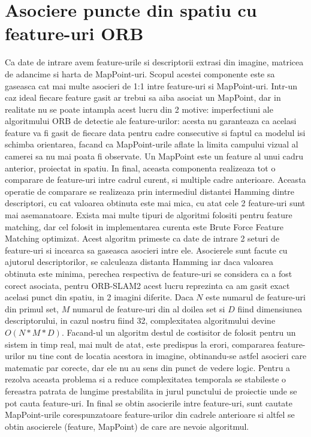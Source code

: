 \documentclass[12pt,a4paper]{report}
\begin{document}
\section{Asociere puncte din spatiu cu feature-uri ORB}
Ca date de intrare avem feature-urile si descriptorii extrasi din imagine, matricea
de adancime si harta de MapPoint-uri. Scopul acestei componente este sa gaseasca 
cat mai multe asocieri de 1:1 intre feature-uri si MapPoint-uri. Intr-un caz ideal
fiecare feature gasit ar trebui sa aiba asociat un MapPoint, dar in realitate nu se 
poate intampla acest lucru din 2 motive: 
imperfectiuni ale algoritmului ORB de detectie ale feature-urilor: acesta nu garanteaza 
ca acelasi feature va fi gasit de fiecare data pentru cadre consecutive si faptul ca 
modelul isi schimba orientarea, facand ca MapPoint-urile aflate la limita campului 
vizual al camerei sa nu mai poata fi observate. Un MapPoint este un feature 
al unui cadru anterior, proiectat in spatiu. In final, aceasta componenta realizeaza 
tot o comparare de feature-uri intre cadrul curent, si multiple cadre anterioare.
Aceasta operatie de comparare se realizeaza prin intermediul distantei Hamming dintre
descriptori, cu cat valoarea obtinuta este mai mica, cu atat cele 2 feature-uri sunt 
mai asemanatoare. Exista mai multe tipuri de algoritmi folositi pentru feature 
matching, dar cel folosit in implementarea curenta este Brute Force Feature Matching
optimizat. Acest algoritm primeste ca date de intrare 2 seturi de feature-uri si 
incearca sa gaseasca asocieri intre ele. Asocierele sunt facute cu ajutorul descriptorilor,
se calculeaza distanta Hamming iar daca valoarea obtinuta este minima, perechea 
respectiva de feature-uri se considera ca a fost corect asociata, pentru ORB-SLAM2 
acest lucru reprezinta ca am gasit exact acelasi punct din spatiu, in 2 imagini diferite.
Daca \(N\) este numarul de feature-uri din primul set, \(M\) numarul de feature-uri din 
al doilea set si \(D\) fiind dimensiunea descriptorului, in cazul nostru fiind 32, complexitatea
algoritmului devine \(O(N * M * D)\). Facand-ul un algoritm destul de costisitor de folosit
pentru un sistem in timp real, mai mult de atat, este predispus la erori, compararea 
feature-urilor nu tine cont de locatia acestora in imagine, obtinandu-se astfel asocieri
care matematic par corecte, dar ele nu au sens din punct de vedere logic. Pentru a rezolva
aceasta problema si a reduce complexitatea temporala se stabileste o fereastra patrata de 
lungime prestabilita in jurul punctului de proiectie unde se pot cauta feature-uri.
In final se obtin asocierile intre feature-uri, sunt cautate MapPoint-urile 
corespunzatoare feature-urilor din cadrele anterioare si altfel se obtin asocierele 
(feature, MapPoint) de care are nevoie algoritmul.      
\end{document}
